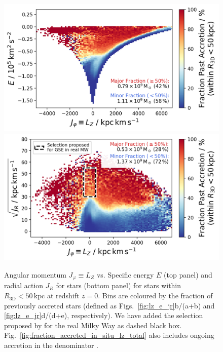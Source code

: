 \documentclass[fleqn,usenatbib]{mnras}
\begin{document}
\begin{figure}
    \centering
    \includegraphics[width=0.94\linewidth]{figures/fraction_accreted_in_situ_lz_e.png}
    \includegraphics[width=0.94\linewidth]{figures/fraction_accreted_in_situ_lz_jr.png}
    \caption{Angular momentum $J_\varphi \equiv L_Z$ vs. Specific energy $E$ (top panel) and radial action $J_R$ for stars (bottom panel) for stars within $R_\mathrm{3D} < 50\,\mathrm{kpc}$ at redshift $z=0$. Bins are coloured by the fraction of previously accreted stars (defined as Figs.~\ref{fig:lz_e_jr}b/(a+b) and \ref{fig:lz_e_jr}d/(d+e), respectively). We have added the selection proposed by \citet{Feuillet2020} for the real Milky Way as dashed black box. Fig.~\ref{fig:fraction_accreted_in_situ_lz_total} also includes ongoing accretion in the denominator \href{https://github.com/svenbuder/golden_thread_I/tree/main/figures}{\faGithub}.}
    \label{fig:fraction_accreted_in_situ_lz}
\end{figure}
\end{document}
